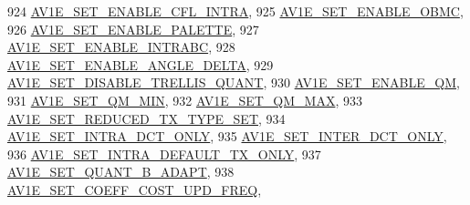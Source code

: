 \begin{DoxyCodeInclude}
{{{{{{{924                                         \hyperlink{group__aom__encoder_ggae78dde67a6d78f332e9bdba0dde42db5a993e0e437aa0d152fe654ba0ab46f9d2}{AV1E\_SET\_ENABLE\_CFL\_INTRA},
925                                         \hyperlink{group__aom__encoder_ggae78dde67a6d78f332e9bdba0dde42db5aa51bc0690a7d51765a01afa015ec2077}{AV1E\_SET\_ENABLE\_OBMC},
926                                         \hyperlink{group__aom__encoder_ggae78dde67a6d78f332e9bdba0dde42db5a98d0e84130317b6c072c2deac106dede}{AV1E\_SET\_ENABLE\_PALETTE},
927                                         \hyperlink{group__aom__encoder_ggae78dde67a6d78f332e9bdba0dde42db5a3e59c51f12c7350fee92c1c0d4901ab0}{AV1E\_SET\_ENABLE\_INTRABC},
928                                         \hyperlink{group__aom__encoder_ggae78dde67a6d78f332e9bdba0dde42db5a3155057080db493c868eb2d42d435b61}{AV1E\_SET\_ENABLE\_ANGLE\_DELTA},
929                                         \hyperlink{group__aom__encoder_ggae78dde67a6d78f332e9bdba0dde42db5a374b5581d0b68d5f8cc3e3f73495cfbb}{AV1E\_SET\_DISABLE\_TRELLIS\_QUANT},
930                                         \hyperlink{group__aom__encoder_ggae78dde67a6d78f332e9bdba0dde42db5ae63993934cdc5aa36efeec4df87a577e}{AV1E\_SET\_ENABLE\_QM},
931                                         \hyperlink{group__aom__encoder_ggae78dde67a6d78f332e9bdba0dde42db5ae611944ba148b6446d4387dd9b452917}{AV1E\_SET\_QM\_MIN},
932                                         \hyperlink{group__aom__encoder_ggae78dde67a6d78f332e9bdba0dde42db5ad897674e1b68b24ec14a01a4e3edacc7}{AV1E\_SET\_QM\_MAX},
933                                         \hyperlink{group__aom__encoder_ggae78dde67a6d78f332e9bdba0dde42db5abc82eae151e4a5050dbc324b5d16be2d}{AV1E\_SET\_REDUCED\_TX\_TYPE\_SET},
934                                         \hyperlink{group__aom__encoder_ggae78dde67a6d78f332e9bdba0dde42db5a56dd8bdd23f09e24e2afea7633f20e74}{AV1E\_SET\_INTRA\_DCT\_ONLY},
935                                         \hyperlink{group__aom__encoder_ggae78dde67a6d78f332e9bdba0dde42db5ac3dcd39257d82c1be99a8752bef6f20b}{AV1E\_SET\_INTER\_DCT\_ONLY},
936                                         \hyperlink{group__aom__encoder_ggae78dde67a6d78f332e9bdba0dde42db5a335eed63dd36dd6e9a83a462c3c15fe1}{AV1E\_SET\_INTRA\_DEFAULT\_TX\_ONLY},
937                                         \hyperlink{group__aom__encoder_ggae78dde67a6d78f332e9bdba0dde42db5a953968db8a041da6fe727add815ad53e}{AV1E\_SET\_QUANT\_B\_ADAPT},
938                                         \hyperlink{group__aom__encoder_ggae78dde67a6d78f332e9bdba0dde42db5a542a607e7d8c6a3d8244136b3e09da4b}{AV1E\_SET\_COEFF\_COST\_UPD\_FREQ},
}}}}}}}
\end{DoxyCodeInclude}
